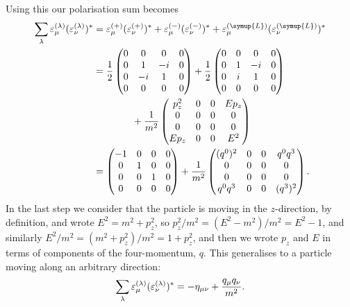 Using this our polarisation sum becomes
\begin{align}
    \sum_\lambda \varepsilon_\mu^{(\lambda)} (\varepsilon_\nu^{(\lambda)})^* &= \varepsilon_\mu^{(+)}(\varepsilon_\nu^{(+)})^* + \varepsilon_\mu^{(-)}(\varepsilon_\nu^{(-)})^* + \varepsilon_\mu^{(\symup{L})}(\varepsilon_\nu^{(\symup{L})})^*\\
    &= \frac{1}{2}
    \begin{pmatrix}
        0 & 0 & 0 & 0\\
        0 & 1 & -i & 0\\
        0 & -i & 1 & 0\\
        0 & 0 & 0 & 0
    \end{pmatrix}
    + \frac{1}{2}
    \begin{pmatrix}
        0 & 0 & 0 & 0\\
        0 & 1 & -i & 0\\
        0 & i & 1 & 0\\
        0 & 0 & 0 & 0
    \end{pmatrix}
    \\
    &\qquad\qquad+ \frac{1}{m^2}
    \begin{pmatrix}
        p_z^2 & 0 & 0 & Ep_z\\
        0 & 0 & 0 & 0\\
        0 & 0 & 0 & 0\\
        Ep_z & 0 & 0 & E^2
    \end{pmatrix}
    \\
    &= 
    \begin{pmatrix}
        -1 & 0 & 0 & 0\\
        0 & 1 & 0 & 0\\
        0 & 0 & 1 & 0\\
        0 & 0 & 0 & 0
    \end{pmatrix}
    + \frac{1}{m^2}
    \begin{pmatrix}
        (q^0)^2 & 0 & 0 & q^0q^3\\
        0 & 0 & 0 & 0\\
        0 & 0 & 0 & 0\\
        q^0q^3 & 0 & 0 & (q^3)^2
    \end{pmatrix}
    .
\end{align}
In the last step we consider that the particle is moving in the \(z\)-direction, by definition, and wrote \(E^2 = m^2 + p_z^2\), so \(p_z^2/m^2 = (E^2 - m^2)/m^2 = E^2 - 1\), and similarly \(E^2/m^2 = (m^2 + p_z^2)/m^2 = 1 + p_z^2\), and then we wrote \(p_z\) and \(E\) in terms of components of the four-momentum, \(q\).
This generalises to a particle moving along an arbitrary direction:
\begin{equation}
    \sum_\lambda \varepsilon_\mu^{(\lambda)}(\varepsilon_\nu^{(\lambda)})^* = -\eta_{\mu\nu} + \frac{q_\mu q_\nu}{m^2}.
\end{equation}

